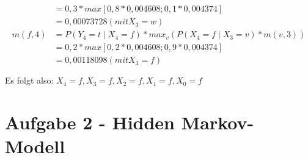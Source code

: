 \documentclass[a4paper,10pt]{article}
\begin{document}
\begin{enumerate}[~~(a)]
\begin{align*}
		&= 0,3 * max[0,8*0,004608;0,1*0,004374]\\
		&= 0,00073728  (mit X_3 = w)\\
		m(f,4) &= P(Y_4 = t \mid X_4 = f) * max_v (P(X_4 = f \mid X_3 = v) * m(v,3)) \\
		&= 0,2 * max[0,2*0,004608;0,9*0,004374]\\
		&= 0,00118098  (mit X_3 = f)\\ \\
	\end{align*}
Es folgt also:
$X_4 = f, X_3 = f, X_2 = f, X_1 = f, X_0 = f$
\end{enumerate}

\section*{Aufgabe 2 - Hidden Markov-Modell}
\end{document}
